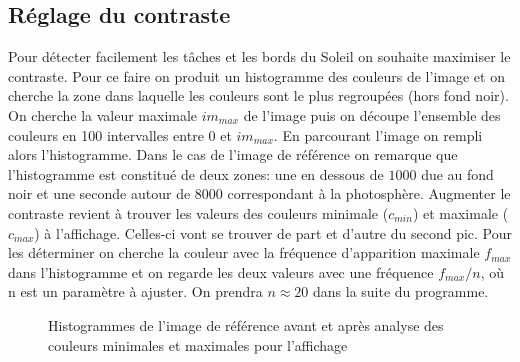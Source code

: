 \documentclass[a4paper,11pt]{article}
\numberwithin{equation}{section}
\begin{document}
\subsection{Réglage du contraste}
Pour détecter facilement les tâches et les bords du Soleil on souhaite maximiser le contraste. Pour ce faire on produit un histogramme des couleurs de l'image et on cherche la zone dans laquelle les couleurs sont le plus regroupées (hors fond noir).\newline
On cherche la valeur maximale $im_{max}$ de l'image puis on découpe l'ensemble des couleurs en 100 intervalles entre 0 et $im_{max}$. En parcourant l'image on rempli alors l'histogramme.\newline
Dans le cas de l'image de référence on remarque que l'histogramme est constitué de deux zones: une en dessous de $1000$ due au fond noir et une seconde autour de $8000$ correspondant à la photosphère. \newline
Augmenter le contraste revient à trouver les valeurs des couleurs minimale ($c_{min}$) et maximale ($c_{max}$) à l'affichage. Celles-ci vont se trouver de part et d'autre du second pic. Pour les déterminer on cherche la couleur avec la fréquence d'apparition maximale $f_{max}$ dans l'histogramme et on regarde les deux valeurs avec une fréquence $f_{max}/n$, où n est un paramètre à ajuster.\newline
On prendra $n \approx 20$ dans la suite du programme.

\begin{figure}[H]
  \centering
  
   \caption{Histogrammes de l'image de référence avant et après analyse des couleurs minimales et maximales pour l'affichage}
\end{figure}
\end{document}

